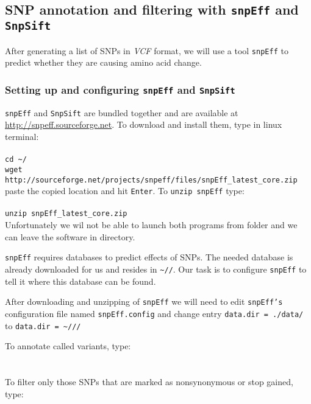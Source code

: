 \subsection{SNP annotation and filtering with \texttt{snpEff} and \texttt{SnpSift}}
After generating a list of SNPs in \textit{VCF} format,
we will use a tool \texttt{snpEff} to predict whether they are causing
amino acid change.
\subsubsection{Setting up and configuring \texttt{snpEff} and \texttt{SnpSift}}
\texttt{snpEff} and \texttt{SnpSift} are bundled together and are available at \url{http://snpeff.sourceforge.net}.
To download and install them, type in linux terminal:\\~\\
\texttt{cd \textasciitilde/\progDir} \\
\texttt{wget http://sourceforge.net/projects/snpeff/files/snpEff\_latest\_core.zip} \\

paste the copied location and hit \texttt{Enter}. To \texttt{unzip snpEff} type:\\~\\
\texttt{unzip snpEff\_latest\_core.zip}\\

Unfortunately we wil not be able to launch both programs from \texttt{\binDir} folder
and we can leave the software in \texttt{\progDir} directory.

\texttt{snpEff} requires databases to predict effects of SNPs.
The needed database is already downloaded for us and resides in
\texttt{\textasciitilde/\dataDir/\snpEffData}. Our task is to 
configure \texttt{snpEff} to tell it where this database can be found.

After downloading and unzipping of \texttt{snpEff} we will need to
edit \texttt{snpEff's} configuration file named \texttt{snpEff.config}
and change entry \texttt{data.dir = ./data/} to \texttt{data.dir = \textasciitilde/\dataDir/\snpEffData/}

To annotate called variants, type:\\~\\
\\

To filter only those SNPs that are marked as nonsynonymous or stop gained, type:\\~\\
\\

